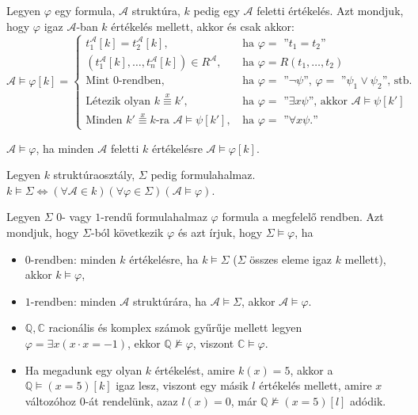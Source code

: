 \begin{defi} Legyen $\varphi$ egy formula, $\mathcal{A}$ struktúra, $k$ pedig egy $\mathcal{A}$ feletti értékelés. Azt mondjuk, hogy $\varphi$ igaz $\mathcal{A}$-ban $k$ értékelés mellett, akkor és csak akkor:
$$
\mathcal{A} \models \varphi[k] = 
\begin{cases}
t^{\mathcal{A}}_1[k] = t^{\mathcal{A}}_2[k], & \text{ ha $\varphi =$ ''$t_1 = t_2$''} \\
(t^\mathcal{A}_1[k], \ldots, t^{\mathcal{A}}_n[k]) \in R^{\mathcal{A}}, & \text{ ha $\varphi = R(t_1, \ldots, t_2)$} \\
\text{Mint $0$-rendben,} & \text{ ha $\varphi =$ ''$\lnot \psi$'', $\varphi =$ ''$\psi_1 \lor \psi_2$'', stb.} \\
\text{Létezik olyan $k \stackrel{x}{\equiv} k'$,}& \text{ ha $\varphi =$ ''$\exists x \psi$'', akkor $\mathcal{A} \models \psi[k']$ } \\
\text{Minden $k' \stackrel{x}{\equiv} k$-ra $\mathcal{A} \models \psi[k']$,} & \text{ ha $\varphi =$ ''$\forall x \psi.$''}
\end{cases}
$$
\end{defi}
\begin{defi}
$\mathcal{A} \models \varphi$, ha minden $\mathcal{A}$ feletti $k$ értékelésre $\mathcal{A} \models \varphi[k]$.
\end{defi}
\begin{defi} Legyen $k$ struktúraosztály, $\Sigma$ pedig formulahalmaz. $k \models \Sigma \Leftrightarrow (\forall \mathcal{A} \in k)(\forall \varphi \in \Sigma)(\mathcal{A} \models \varphi)$.
\end{defi}
\begin{defi} Legyen $\Sigma$ $0$- vagy $1$-rendű formulahalmaz $\varphi$ formula a megfelelő rendben. Azt mondjuk, hogy $\Sigma$-ból következik $\varphi$ és azt írjuk, hogy $\Sigma \models \varphi$, ha
\begin{itemize}
\item $0$-rendben: minden $k$ értékelésre, ha $k \models \Sigma$ ($\Sigma$ összes eleme igaz $k$ mellett), akkor $k \models \varphi$,
\item $1$-rendben: minden $\mathcal{A}$ struktúrára, ha $\mathcal{A} \models \Sigma$, akkor $\mathcal{A} \models \varphi$.
\end{itemize}
\end{defi}
\begin{exmpl} 
\begin{itemize}
\item $\mathbb{Q}, \mathbb{C}$ racionális és komplex számok gyűrűje mellett legyen $\varphi = \exists x(x\cdot x = -1)$, ekkor $\mathbb{Q} \not\models \varphi$, viszont $\mathbb{C} \models \varphi$.
\item Ha megadunk egy olyan $k$ értékelést, amire $k(x)=5$, akkor a $\mathbb{Q} \models (x = 5)[k]$ igaz lesz, viszont egy másik $l$ értékelés mellett, amire $x$ változóhoz $0$-át rendelünk, azaz $l(x)=0$, már $\mathbb{Q} \not\models (x = 5)[l]$ adódik.
\end{itemize}
\end{exmpl}
